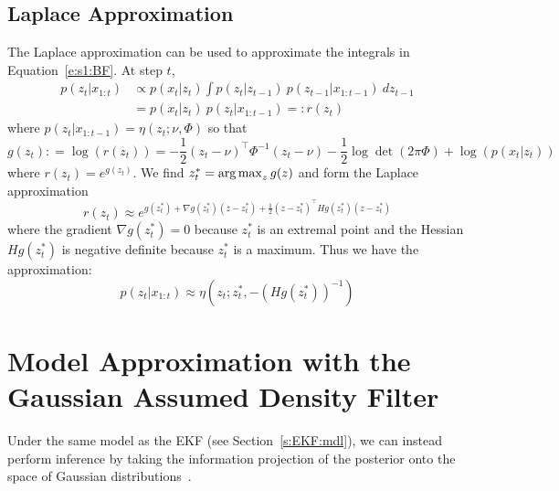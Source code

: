 \subsection{Laplace Approximation} \label{s:Laplace}
The Laplace approximation can be used to approximate the integrals in Equation~\ref{e:s1:BF}.  At step $t$,
\begin{align*}
p(z_t | x_{1:t})  
& \propto p(x_t | z_t) \int p(z_t|z_{t-1})\ p(z_{t-1} | x_{1:t-1})\ dz_{t-1} \\
& = p(x_t | z_t)\ p(z_t| x_{1:t-1}) =: r(z_t)
\end{align*}
where $p(z_t| x_{1:t-1}) = \eta(z_t; \nu,\Phi)$ so that
\[
g(z_t): = \log(r(z_t))
= -\frac{1}{2}(z_t-\nu)^\intercal \Phi^{-1} (z_t-\nu) -\frac{1}{2}\log\det(2\pi \Phi) + \log(p(x_t | z_t))
\]
where $r(z_t) = e^{g(z_t)}$.  We find $z_t^* = \operatorname*{\arg\max}_{z}g(z)$ and form the Laplace approximation
\[
r(z_t) \approx e^{g(z_t^*) + \nabla g(z_t^*)(z-z_t^*) + \tfrac{1}{2} (z-z_t^*)^\intercal Hg(z_t^*)(z-z_t^*)}
\]
where the gradient $\nabla g(z_t^*)=0$ because $z_t^*$ is an extremal point and the Hessian $Hg(z_t^*)$ is negative definite because $z_t^*$ is a maximum.  Thus we have the approximation:
\[
p(z_t | x_{1:t})   \approx \eta(z_t; z_t^*, -(Hg(z_t^*))^{-1})
\]


\section{Model Approximation with the Gaussian Assumed Density Filter} \label{s:ADF} 

Under the same model as the EKF (see Section~\ref{s:EKF:mdl}), we can instead perform inference by taking the information projection of the posterior onto the space of Gaussian distributions~\cite{Min01}.

